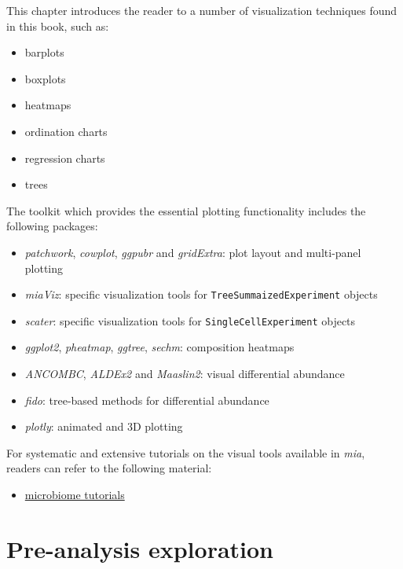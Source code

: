 \documentclass[
]{book}
\providecommand{\tightlist}{%
  \setlength{\itemsep}{0pt}\setlength{\parskip}{0pt}}
\begin{document}
This chapter introduces the reader to a number of visualization
techniques found in this book, such as:

\begin{itemize}
\tightlist
\item
  barplots
\item
  boxplots
\item
  heatmaps
\item
  ordination charts
\item
  regression charts
\item
  trees
\end{itemize}

The toolkit which provides the essential plotting functionality
includes the following packages:

\begin{itemize}
\tightlist
\item
  \emph{patchwork}, \emph{cowplot}, \emph{ggpubr} and \emph{gridExtra}: plot layout and multi-panel plotting
\item
  \emph{miaViz}: specific visualization tools for \texttt{TreeSummaizedExperiment} objects
\item
  \emph{scater}: specific visualization tools for \texttt{SingleCellExperiment} objects
\item
  \emph{ggplot2}, \emph{pheatmap}, \emph{ggtree}, \emph{sechm}: composition heatmaps
\item
  \emph{ANCOMBC}, \emph{ALDEx2} and \emph{Maaslin2}: visual differential abundance
\item
  \emph{fido}: tree-based methods for differential abundance
\item
  \emph{plotly}: animated and 3D plotting
\end{itemize}

For systematic and extensive tutorials on the visual tools available
in \emph{mia}, readers can refer to the following material:

\begin{itemize}
\tightlist
\item
  \href{https://microbiome.github.io/tutorials/}{microbiome tutorials}
\end{itemize}

\hypertarget{pre-analysis-exploration}{%
\section{Pre-analysis exploration}\label{pre-analysis-exploration}}
\end{document}
